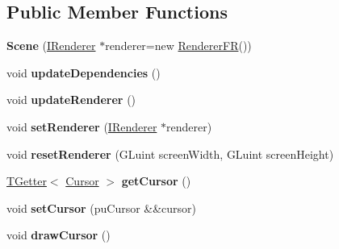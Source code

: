 \subsection*{Public Member Functions}
\begin{DoxyCompactItemize}
\item 
\mbox{\label{classflw_1_1flf_1_1Scene_a1ceaacc66862e2076c90c0950adf5a6e}} 
{\bfseries Scene} (\hyperlink{classflw_1_1flf_1_1IRenderer}{I\+Renderer} $\ast$renderer=new \hyperlink{classflw_1_1flf_1_1RendererFR}{Renderer\+FR}())
\item 
\mbox{\label{classflw_1_1flf_1_1Scene_ae08f1db7a2c35bfa3f0a24ad7c9a46d8}} 
void {\bfseries update\+Dependencies} ()
\item 
\mbox{\label{classflw_1_1flf_1_1Scene_a196bb868974bc3c5f6865ca821461174}} 
void {\bfseries update\+Renderer} ()
\item 
\mbox{\label{classflw_1_1flf_1_1Scene_ae870562f7634904be71e557b6da17881}} 
void {\bfseries set\+Renderer} (\hyperlink{classflw_1_1flf_1_1IRenderer}{I\+Renderer} $\ast$renderer)
\item 
\mbox{\label{classflw_1_1flf_1_1Scene_a3414f963a43c363a7038caba861ebf0c}} 
void {\bfseries reset\+Renderer} (G\+Luint screen\+Width, G\+Luint screen\+Height)
\item 
\mbox{\label{classflw_1_1flf_1_1Scene_a8cec08d2b8e5d96db819a07f4d45fa6c}} 
\hyperlink{classflw_1_1TGetter}{T\+Getter}$<$ \hyperlink{classflw_1_1flf_1_1Cursor}{Cursor} $>$ {\bfseries get\+Cursor} ()
\item 
\mbox{\label{classflw_1_1flf_1_1Scene_a7a13521bfe9a7934e68896c9555198f4}} 
void {\bfseries set\+Cursor} (pu\+Cursor \&\&cursor)
\item 
\mbox{\label{classflw_1_1flf_1_1Scene_a3fb07bdaee525b5aea45573353a9673d}} 
void {\bfseries draw\+Cursor} ()
\item 
\mbox{\label{classflw_1_1flf_1_1Scene_ad32ee27148ceeadda8e883936f072cfe}} 

\end{DoxyCompactItemize}
